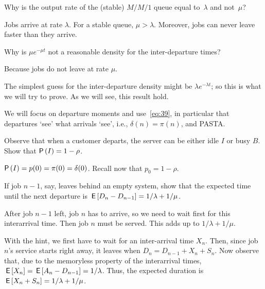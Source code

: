 \begin{exercise}\label{ex:dep}
Why is the output rate of the (stable) $M/M/1$ queue equal to~$\lambda$ and not~$\mu$?
\begin{solution}
Jobs arrive at rate $\lambda$. For a stable queue, $\mu>\lambda$. Moreover,  jobs can never leave faster than they arrive.
\end{solution}
\end{exercise}


\begin{exercise}
Why is $\mu e^{-\mu t}$ not a reasonable density for the
    inter-departure times?
    \begin{solution}
         Because jobs do not leave at rate $\mu$. 
    \end{solution}
\end{exercise}

The simplest guess for the inter-departure density might be $\lambda e^{-\lambda t}$; so this is what we will try to prove. As we will see, this result hold. 

We will focus on departure moments and use~\eqref{eq:39}, in particular that departures `see' what arrivals `see', i.e., $\delta(n)= \pi(n)$, and PASTA.


\begin{exercise}
 Observe that when a customer departs, the server can be either
    idle $I$ or busy $B$.   Show that $\P{I} = 1-\rho$.
    \begin{solution}
 $\P I = p(0) =\pi(0)=\delta(0)$.  Recall now that $p_0 = 1-\rho$.
    \end{solution}
\end{exercise}

\begin{exercise}\label{ex:17}
 If job $n-1$, say, leaves behind an empty system, show that the expected time until the next departure is $\,\mathsf{E}\left[D_n - D_{n-1}\right] = 1/\lambda + 1/\mu$. 
    \begin{hint}
      After job $n-1$ left, job $n$ has to arrive, so we need to wait first for this interarrival time. Then job $n$ must be served. This adds up to $1/\lambda + 1/\mu$. 
    \end{hint}
    \begin{solution}
With the hint, we first have to wait for an inter-arrival
    time $X_n$. Then, since job $n$'s service starts right away, it
    leaves when $D_n = D_{n-1}+X_n + S_n$. Now observe that, due to the memoryless property of the interarrival times, $\,\mathsf{E}\left[X_n\right] = \,\mathsf{E}\left[A_n - D_{n-1}\right] = 1/\lambda$. Thus, the expected duration is $\,\mathsf{E}\left[X_n + S_n\right]=1/\lambda + 1/\mu$. 
    \end{solution}
\end{exercise}

